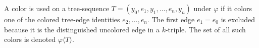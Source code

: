\begin{definition}
A color is used on a tree-sequence
$T=(y_0,e_1,y_1,\ldots,e_n,y_n)$ under $\varphi$ if it colors one of the
colored tree-edge identities $e_2,\ldots,e_n$.  The first edge $e_1=e_0$
is excluded because it is the distinguished uncolored edge in a
$k$-triple.  The set of all such colors is denoted $\varphi\langle T\rangle$.
\end{definition}
